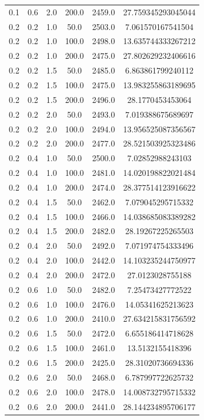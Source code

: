 \begin{tabular}{cccccc}
0.1 & 0.6 & 2.0 & 200.0 & 2459.0 & 27.759345293045044 \\
0.2 & 0.2 & 1.0 & 50.0 & 2503.0 & 7.061570167541504 \\
0.2 & 0.2 & 1.0 & 100.0 & 2498.0 & 13.635744333267212 \\
0.2 & 0.2 & 1.0 & 200.0 & 2475.0 & 27.802629232406616 \\
0.2 & 0.2 & 1.5 & 50.0 & 2485.0 & 6.863861799240112 \\
0.2 & 0.2 & 1.5 & 100.0 & 2475.0 & 13.983255863189695 \\
0.2 & 0.2 & 1.5 & 200.0 & 2496.0 & 28.1770453453064 \\
0.2 & 0.2 & 2.0 & 50.0 & 2493.0 & 7.019388675689697 \\
0.2 & 0.2 & 2.0 & 100.0 & 2494.0 & 13.956525087356567 \\
0.2 & 0.2 & 2.0 & 200.0 & 2477.0 & 28.521503925323486 \\
0.2 & 0.4 & 1.0 & 50.0 & 2500.0 & 7.02852988243103 \\
0.2 & 0.4 & 1.0 & 100.0 & 2481.0 & 14.020198822021484 \\
0.2 & 0.4 & 1.0 & 200.0 & 2474.0 & 28.377514123916622 \\
0.2 & 0.4 & 1.5 & 50.0 & 2462.0 & 7.079045295715332 \\
0.2 & 0.4 & 1.5 & 100.0 & 2466.0 & 14.038685083389282 \\
0.2 & 0.4 & 1.5 & 200.0 & 2482.0 & 28.19267225265503 \\
0.2 & 0.4 & 2.0 & 50.0 & 2492.0 & 7.071974754333496 \\
0.2 & 0.4 & 2.0 & 100.0 & 2442.0 & 14.103235244750977 \\
0.2 & 0.4 & 2.0 & 200.0 & 2472.0 & 27.0123028755188 \\
0.2 & 0.6 & 1.0 & 50.0 & 2482.0 & 7.25473427772522 \\
0.2 & 0.6 & 1.0 & 100.0 & 2476.0 & 14.05341625213623 \\
0.2 & 0.6 & 1.0 & 200.0 & 2410.0 & 27.634215831756592 \\
0.2 & 0.6 & 1.5 & 50.0 & 2472.0 & 6.655186414718628 \\
0.2 & 0.6 & 1.5 & 100.0 & 2461.0 & 13.5132155418396 \\
0.2 & 0.6 & 1.5 & 200.0 & 2425.0 & 28.31020736694336 \\
0.2 & 0.6 & 2.0 & 50.0 & 2468.0 & 6.787997722625732 \\
0.2 & 0.6 & 2.0 & 100.0 & 2478.0 & 14.008732795715332 \\
0.2 & 0.6 & 2.0 & 200.0 & 2441.0 & 28.144234895706177 \\

\end{tabular}
